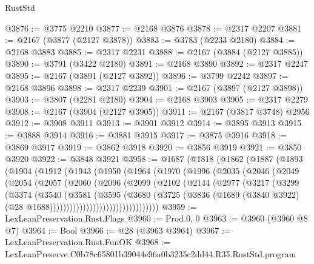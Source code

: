 \begin{lexlean}{RustStd}
\begin{coremodule}
@3876 := @3775 @2210
@3877 := @2168 @3876
@3878 := @2317 @2207
@3881 := @2167 (@3877 (@2127 @3878))
@3883 := @3783 (@2233 @2180)
@3884 := @2168 @3883
@3885 := @2317 @2231
@3888 := @2167 (@3884 (@2127 @3885))
@3890 := @3791 (@3422 @2180)
@3891 := @2168 @3890
@3892 := @2317 @2247
@3895 := @2167 (@3891 (@2127 @3892))
@3896 := @3799 @2242
@3897 := @2168 @3896
@3898 := @2317 @2239
@3901 := @2167 (@3897 (@2127 @3898))
@3903 := @3807 (@2281 @2180)
@3904 := @2168 @3903
@3905 := @2317 @2279
@3908 := @2167 (@3904 (@2127 @3905))
@3911 := @2167 (@3817 @3748) @2956
@3912 := @3908 @3911
@3913 := @3901 @3912
@3914 := @3895 @3913
@3915 := @3888 @3914
@3916 := @3881 @3915
@3917 := @3875 @3916
@3918 := @3869 @3917
@3919 := @3862 @3918
@3920 := @3856 @3919
@3921 := @3850 @3920
@3922 := @3848 @3921
@3958 := @1687
    (@1818
      (@1862
        (@1887
          (@1893
            (@1904
              (@1912
                (@1943
                  (@1950
                    (@1964
                      (@1970
                        (@1996
                          (@2035
                            (@2046
                              (@2049
                                (@2054
                                  (@2057
                                    (@2060
                                      (@2096
                                        (@2099
                                          (@2102
                                            (@2144
                                              (@2977
                                                (@3217
                                                  (@3299
                                                    (@3374
                                                      (@3540
                                                        (@3581
                                                          (@3595
                                                            (@3680
                                                              (@3725
                                                                (@3836
                                                                  (@1689
                                                                    (@3840 @3922)
                                                                    (@28
                                                                      @1688)))))))))))))))))))))))))))))))))
@3959 := LexLeanPreservation.Rust.Flags
@3960 := Prod.{0, 0}
@3963 := @3960 (@3960 @8 @7)
@3964 := Bool
@3966 := @28 (@3963 @3964)
@3967 := LexLeanPreservation.Rust.FunOK
@3968 := LexLeanPreserve.C0b78c65801b39044e96a0b3235c2dd44.R35.RustStd.program

\end{coremodule}
\end{lexlean}
